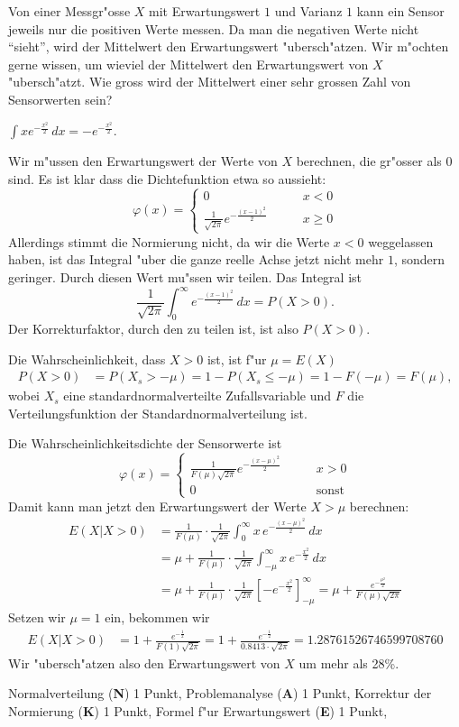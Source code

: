 Von einer Messgr"osse $X$ mit Erwartungswert $1$ und Varianz $1$
kann ein Sensor jeweils nur die positiven Werte messen.
Da man die negativen Werte nicht ``sieht'', wird der Mittelwert 
den Erwartungswert "ubersch"atzen.
Wir m"ochten gerne wissen, um wieviel der Mittelwert den Erwartungswert
von $X$ "ubersch"atzt.
Wie gross wird der Mittelwert einer sehr grossen Zahl von Sensorwerten sein?

\begin{hinweis}
$\int xe^{-\frac{x^2}2}\,dx = -e^{-\frac{x^2}2}.$
\end{hinweis}

\begin{loesung}
Wir m"ussen den Erwartungswert der Werte von $X$ berechnen, die gr"osser
als $0$ sind. Es ist klar dass die Dichtefunktion etwa so aussieht:
\[
\varphi(x)=\begin{cases}
0&\qquad x<0\\
\frac1{\sqrt{2\pi}}e^{-\frac{(x-1)^2}2}&\qquad x\ge 0
\end{cases}
\]
Allerdings stimmt die Normierung nicht, da wir die Werte $x < 0$ weggelassen
haben, ist das Integral "uber die ganze reelle Achse jetzt nicht mehr $1$,
sondern geringer. Durch diesen Wert mu"ssen wir teilen. Das Integral ist
\[
\frac1{\sqrt{2\pi}}
\int_{0}^\infty
e^{-\frac{(x-1)^2}2}\,dx=
P(X > 0).
\]
Der Korrekturfaktor, durch den zu teilen ist, ist also $P(X>0)$.

Die Wahrscheinlichkeit, dass $X>0$ ist, ist f"ur $\mu=E(X)$
\begin{align*}
P(X>0)&=P(X_s > -\mu)=1-P(X_s\le-\mu)=1-F(-\mu)=F(\mu),
\end{align*}
wobei $X_s$ eine standardnormalverteilte Zufallsvariable und $F$ die
Verteilungsfunktion der Standardnormalverteilung ist.

Die Wahrscheinlichkeitsdichte der Sensorwerte ist
\[
\varphi(x)=\begin{cases}
\displaystyle
\frac1{F(\mu)\sqrt{2\pi}}e^{-\frac{(x-\mu)^2}2}&\qquad x > 0\\
0&\qquad\text{sonst}
\end{cases}
\]
Damit kann man jetzt
den Erwartungswert der Werte $X>\mu$ berechnen:
\begin{align*}
E(X| X > 0)
&=
\frac1{F(\mu)}\cdot\frac1{\sqrt{2\pi}}\int_0^\infty x\,e^{-\frac{(x-\mu)^2}2}\,dx
\\
&=
\mu + \frac1{F(\mu)}\cdot\frac1{\sqrt{2\pi}}\int_{-\mu}^\infty x\,e^{-\frac{x^2}2}\,dx
\\
&=
\mu + \frac1{F(\mu)}
\cdot\frac1{\sqrt{2\pi}}
\left[
-e^{-\frac{x^2}2}
\right]_{-\mu}^\infty
=\mu + \frac{e^{-\frac{\mu^2}2}}{F(\mu)\sqrt{2\pi}}
\end{align*}
Setzen wir $\mu=1$ ein, bekommen wir
\begin{align*}
E(X|X>0)
&
=
1+\frac{e^{-\frac12}}{F(1)\sqrt{2\pi}}
=
1+\frac{e^{-\frac12}}{0.8413\cdot \sqrt{2\pi}}=1.28761526746599708760
\end{align*}
Wir "ubersch"atzen also den Erwartungswert von $X$ um mehr als 28\%.
\end{loesung}

\begin{bewertung}
Normalverteilung ({\bf N}) 1 Punkt,
Problemanalyse ({\bf A}) 1 Punkt,
Korrektur der Normierung ({\bf K}) 1 Punkt,
Formel f"ur Erwartungswert ({\bf E}) 1 Punkt,
\end{bewertung}

